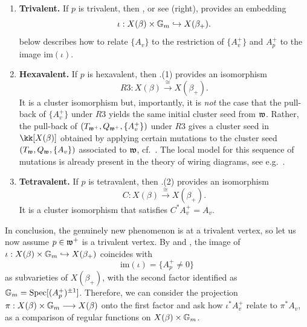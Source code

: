 \begin{enumerate}
\item {\bf Trivalent.} If $p$ is trivalent, then , or see  (right), provides an embedding
$$\iota:X(\beta)\times\mathbb{G}_m\hookrightarrow X(\beta_+).$$
 below describes how to relate $\{A_v\}$ to the restriction of $\{A^+_v\}$ and $A^+_p$ to the image $\mbox{im}(\iota)$.\\

\item {\bf Hexavalent.} If $p$ is hexavalent, then .(1) provides an isomorphism
$$R3:X(\beta)\stackrel{\cong}{\longrightarrow} X(\beta_+).$$
It is a cluster isomorphism but, importantly, it is {\it not} the case that the pull-back of $\{A_v^+\}$ under $R3$ yields the same initial cluster seed from $\mathfrak{w}$. Rather, the pull-back of $(T_{\mathfrak{w}^+},Q_{\mathfrak{w}^+},\{A_v^+\})$ under $R3$ gives a cluster seed in $\kk[X(\beta)]$ obtained by applying certain mutations to the cluster seed $(T_{\mathfrak{w}},Q_{\mathfrak{w}},\{A_v\})$ associated to $\mathfrak{w}$, cf.~\cite[Remark 2.7]{casals2025comparingclusteralgebrasbraid}. The local model for this sequence of mutations is already present in the theory of wiring diagrams, see e.g.~\cite[Prop.~3.2.3]{FWZ16}.\\

\item {\bf Tetravalent.} If $p$ is tetravalent, then .(2) provides an isomorphism
$$C:X(\beta)\stackrel{\cong}{\longrightarrow} X(\beta_+).$$
It is a cluster isomorphism that satisfies $C^*A_v^+=A_v$.\\
\end{enumerate}

\noindent In conclusion, the genuinely new phenomenon is at a trivalent vertex, so let us now assume $p\in\mathfrak{w}^+$ is a trivalent vertex. By  and , the image of $\iota:X(\beta)\times\mathbb{G}_m\hookrightarrow X(\beta_+)$ coincides with
$$\mbox{im}(\iota)=\{A^+_p\neq0\}$$
as subvarieties of $X(\beta_+)$, with the second factor identified as $\mathbb{G}_m=\operatorname{Spec}[(A_p^+)^{\pm1}]$. Therefore, we can consider the projection $\pi:X(\beta)\times\mathbb{G}_m\longrightarrow X(\beta)$ onto the first factor and ask how $\iota^*A^+_v$ relate to $\pi^*A_v$, as a comparison of regular functions on $X(\beta)\times\mathbb{G}_m$.\\

